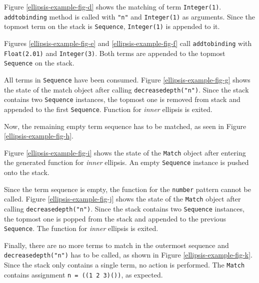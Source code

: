 Figure \ref{ellipsis-example-fig-d} shows the matching of term \texttt{Integer(1)}. \texttt{addtobinding} method is called with \texttt{"n"} and \texttt{Integer(1)} as arguments. Since the topmost term on the stack is \texttt{Sequence}, \texttt{Integer(1)} is appended to it.

Figures \ref{ellipsis-example-fig-e} and \ref{ellipsis-example-fig-f} call \texttt{addtobinding} with \texttt{Float(2.01)} and \texttt{Integer(3)}. Both terms are appended to the topmost \texttt{Sequence} on the stack.

All terms in \texttt{Sequence} have been consumed. Figure \ref{ellipsis-example-fig-g} shows the state of the match object after calling \texttt{decreasedepth("n")}. Since the stack contains two \texttt{Sequence} instances, the topmost one is removed from stack and appended to the first \texttt{Sequence}. Function for \textit{inner} ellipsis is exited.

Now, the remaining empty term sequence has to be matched, as seen in Figure \ref{ellipsis-example-fig-h}.

Figure \ref{ellipsis-example-fig-i} shows the state of the \texttt{Match} object after entering the generated function for \textit{inner} ellipsis. An empty \texttt{Sequence} instance is pushed onto the stack.

Since the term sequence is empty, the function for the \texttt{number} pattern cannot be called. Figure \ref{ellipsis-example-fig-j} shows the state of the \texttt{Match} object after calling \texttt{decreasedepth("n")}. Since the stack contains two \texttt{Sequence} instances, the topmost one is popped from the stack and appended to the previous \texttt{Sequence}. The function for \textit{inner} ellipsis is exited.

Finally, there are no more terms to match in the outermost sequence and \texttt{decreasedepth("n")} has to be called, as shown in Figure \ref{ellipsis-example-fig-k}. Since the stack only contains a single term, no action is performed. The \texttt{Match} contains assignment \texttt{n = ((1 2 3)())}, as expected.

